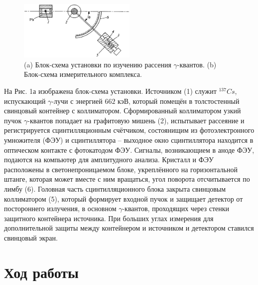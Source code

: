 \documentclass[a4paper,12pt]{article} %
\begin{document}
    \begin{figure}[h]
      \includegraphics[width=0.5\textwidth]{img/1.png}
      \centering
      \caption{(a) Блок-схема установки по изучению рассения $\gamma$-квантов. (b) Блок-схема измерительного комплекса.}
    \end{figure}
    На Рис. 1а изображена блок-схема установки. 
    Источником (1) служит $^{137} Cs$, испускающий $\gamma$-лучи с энергией $662$ кэВ, который помещён в толстостенный свинцовый контейнер с коллиматором. 
    Сформированный коллиматором узкий пучок $\gamma$-квантов попадает на графитовую мишень (2), испытывает рассеяние и регистрируется сцинтилляционным счётчиком, состоянищим из фотоэлектронного умножителя (ФЭУ) и сцинтиллятора -- выходное окно сцинтиллятора находится в оптическом контакте с фотокатодом ФЭУ. 
    Сигналы, возникающием в аноде ФЭУ, подаются на компьютер для амплитудного анализа. 
    Кристалл и ФЭУ расположены в светонепроницаемом блоке, укреплённого на горизонтальной штанге, которая может вместе с ним вращаться, угол поворота отсчитывается по лимбу (6). 
    Головная часть сцинтилляционного блока закрыта свинцовым коллиматором (5), который формирует входной пучок и защищает детектор от постороннего излучения, в основном $\gamma$-квантов, проходящих через стенки защитного контейнера источника. 
    При больших углах измерения для дополнительной защиты между контейнером и источником и детектором ставился свинцовый экран.
  
  \section{Ход работы}
\end{document}
